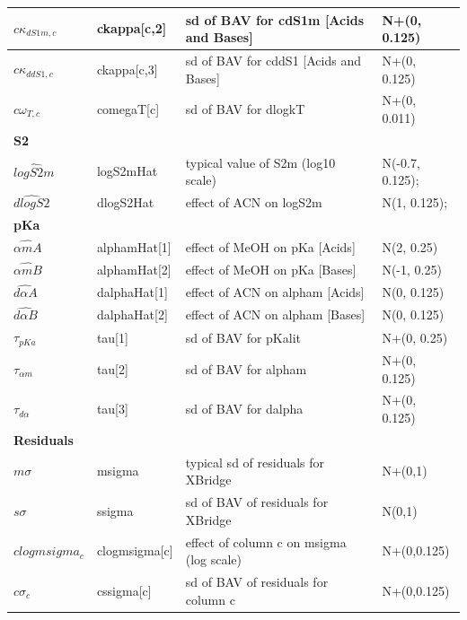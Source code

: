\documentclass[
]{article}
\begin{document}
\begin{longtable}[t]{l|l|l|l}
\hline
\hspace{1em}$c\kappa_{dS1m,c}$ & ckappa[c,2] & sd of BAV for cdS1m [Acids and Bases] & N+(0, 0.125)\\
\hline
\hspace{1em}$c\kappa_{ddS1,c}$ & ckappa[c,3] & sd of BAV for cddS1 [Acids and Bases] & N+(0, 0.125)\\
\hline
\hspace{1em}$c\omega_{T,c}$ & comegaT[c] & sd of BAV for dlogkT & N+(0, 0.011)\\
\hline
\multicolumn{4}{l}{\textbf{S2}}\\
\hline
\hspace{1em}$\widehat{logS2m}$ & logS2mHat & typical value of S2m (log10 scale) & N(-0.7, 0.125);\\
\hline
\hspace{1em}$\widehat{dlogS2}$ & dlogS2Hat & effect of ACN on logS2m & N(1, 0.125);\\
\hline
\multicolumn{4}{l}{\textbf{pKa}}\\
\hline
\hspace{1em}$\widehat{\alpha mA}$ & alphamHat[1] & effect of MeOH on pKa [Acids] & N(2, 0.25)\\
\hline
\hspace{1em}$\widehat{\alpha mB}$ & alphamHat[2] & effect of MeOH on pKa [Bases] & N(-1, 0.25)\\
\hline
\hspace{1em}$\widehat{d\alpha A}$ & dalphaHat[1] & effect of ACN on alpham [Acids] & N(0, 0.125)\\
\hline
\hspace{1em}$\widehat{d\alpha B}$ & dalphaHat[2] & effect of ACN on alpham [Bases] & N(0, 0.125)\\
\hline
\hspace{1em}$\tau_{pKa}$ & tau[1] & sd of BAV for pKalit & N+(0, 0.25)\\
\hline
\hspace{1em}$\tau_{\alpha m}$ & tau[2] & sd of BAV for alpham & N+(0, 0.125)\\
\hline
\hspace{1em}$\tau_{d\alpha}$ & tau[3] & sd of BAV for dalpha & N+(0, 0.125)\\
\hline
\multicolumn{4}{l}{\textbf{Residuals}}\\
\hline
\hspace{1em}$m\sigma$ & msigma & typical sd of residuals for XBridge & N+(0,1)\\
\hline
\hspace{1em}$s\sigma$ & ssigma & sd of BAV of residuals for XBridge & N(0,1)\\
\hline
\hspace{1em}$clogmsigma_c$ & clogmsigma[c] & effect of column c on msigma (log scale) & N+(0,0.125)\\
\hline
\hspace{1em}$c\sigma_c$ & cssigma[c] & sd of BAV of residuals for column c & N+(0,0.125)\\
\hline
\end{longtable}
\end{document}
